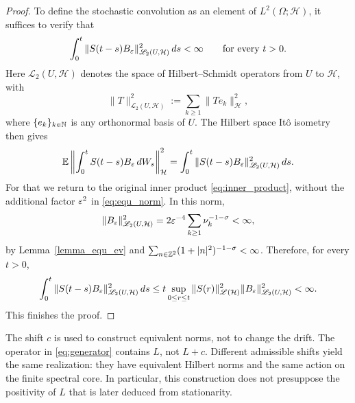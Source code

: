 \begin{proof}
To define the stochastic convolution as an element of
$L^2(\Omega;\mathcal H)$, it suffices to verify that
\[
    \int_0^t
    \|S(t-s)B_\varepsilon\|_{\mathscr L_2(U,\mathcal H)}^2\,ds
    <\infty
    \qquad\text{for every }t>0.
\]
Here $\mathscr L_2(U,\mathcal H)$ denotes the space of
Hilbert--Schmidt operators from $U$ to $\mathcal H$, with
\[
    \|T\|_{\mathscr L_2(U,\mathcal H)}^2
    :=\sum_{k\geq1}\|Te_k\|_{\mathcal H}^2,
\]
where $\{e_k\}_{k \in \mathbb{N}}$ is any orthonormal basis of $U$.
The Hilbert space Itô isometry then gives
\[
    \mathbb E\left\|
        \int_0^t S(t-s)B_\varepsilon\,dW_s
    \right\|_{\mathcal H}^2
    =
    \int_0^t
    \|S(t-s)B_\varepsilon\|_{\mathscr L_2(U,\mathcal H)}^2\,ds.
\]
For that we return to the original inner
product \eqref{eq:inner_product}, without the additional factor
\(\varepsilon^2\) in \eqref{eq:equ_norm}. In this norm,
\[
 \|B_\varepsilon\|_{\mathscr L_2(U,\mathcal{H})}^2
 =2\varepsilon^{-4}\sum_{k\geq1}\nu_k^{-1-\sigma}<\infty,
\]
by Lemma~\ref{lemma_equ_ev} and \(\sum_{n\in\mathbb{Z}^2}(1+|n|^2)^{-1-\sigma}<\infty\).
Therefore, for every \(t>0\),
\[
 \int_0^t\|S(t-s)B_\varepsilon\|_{\mathscr L_2(U,\mathcal{H})}^2\,ds
 \leq t\sup_{0\leq r\leq t}\|S(r)\|_{\mathscr L(\mathcal{H})}^2
             \|B_\varepsilon\|_{\mathscr L_2(U,\mathcal{H})}^2<\infty.
\]
This finishes the proof.
\end{proof}

\begin{remark}
The shift \(c\) is used to construct equivalent norms, not to change
the drift. The operator in \eqref{eq:generator} contains \(L\),
not \(L+c\). Different admissible shifts yield the same realization:
they have equivalent Hilbert norms and the same action on the
finite spectral core. In particular, this construction does not
presuppose the positivity of \(L\) that is later deduced from
stationarity.
\end{remark}

